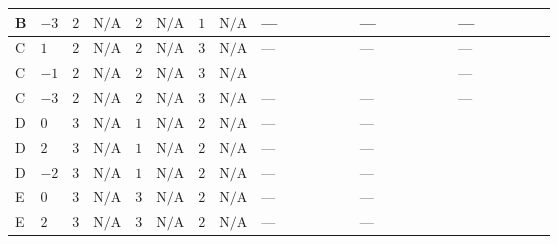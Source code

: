 \documentclass[8pt]{article}
\begin{document}
\begin{landscape}
\begin{longtable}{@{}llcccccc >{\raggedright\arraybackslash}p{0.21\linewidth} >{\raggedright\arraybackslash}p{0.21\linewidth} >{\raggedright\arraybackslash}p{0.21\linewidth}@{}}
\midrule
B & $-3$ & $2$ & $\text{N/A}$ & $2$ & $\text{N/A}$ & $1$ & $\text{N/A}$ & --- & --- & --- \\
\midrule
C & $1$ & $2$ & $\text{N/A}$ & $2$ & $\text{N/A}$ & $3$ & $\text{N/A}$ & --- & --- & --- \\
\midrule
C & $-1$ & $2$ & $\text{N/A}$ & $2$ & $\text{N/A}$ & $3$ & $\text{N/A}$ & \scriptsize\adjustbox{max width=\linewidth}{$\begin{gathered} +8 {\lambda_{8}} \left({\lambda_{8}}\right)^{*}\end{gathered}$} & \scriptsize\adjustbox{max width=\linewidth}{$\begin{gathered} +4 {\lambda_{X_{17}}^{(1)}} \left({\lambda_{X_{17}}^{(1)}}\right)^{*}\end{gathered}$} & --- \\
\midrule
C & $-3$ & $2$ & $\text{N/A}$ & $2$ & $\text{N/A}$ & $3$ & $\text{N/A}$ & --- & --- & --- \\
\midrule
D & $0$ & $3$ & $\text{N/A}$ & $1$ & $\text{N/A}$ & $2$ & $\text{N/A}$ & --- & --- & \scriptsize\adjustbox{max width=\linewidth}{$\begin{gathered} +3 {\lambda_{HS_1}^{(A)}}^2\end{gathered}$} \\
\midrule
D & $2$ & $3$ & $\text{N/A}$ & $1$ & $\text{N/A}$ & $2$ & $\text{N/A}$ & --- & --- & \scriptsize\adjustbox{max width=\linewidth}{$\begin{gathered} +3 {\lambda_{HS_1}^{(A)}}^2\end{gathered}$} \\
\midrule
D & $-2$ & $3$ & $\text{N/A}$ & $1$ & $\text{N/A}$ & $2$ & $\text{N/A}$ & --- & --- & \scriptsize\adjustbox{max width=\linewidth}{$\begin{gathered} +3 {\lambda_{HS_1}^{(A)}}^2\end{gathered}$} \\
\midrule
E & $0$ & $3$ & $\text{N/A}$ & $3$ & $\text{N/A}$ & $2$ & $\text{N/A}$ & --- & --- & \scriptsize\adjustbox{max width=\linewidth}{$\begin{gathered} +3 {\lambda_{HS_1}^{(A)}}^2\end{gathered}$} \\
\midrule
E & $2$ & $3$ & $\text{N/A}$ & $3$ & $\text{N/A}$ & $2$ & $\text{N/A}$ & --- & --- & \scriptsize\adjustbox{max width=\linewidth}{$\begin{gathered} +3 {\lambda_{HS_1}^{(A)}}^2\end{gathered}$} \\

\end{longtable}
\end{landscape}
\end{document}
